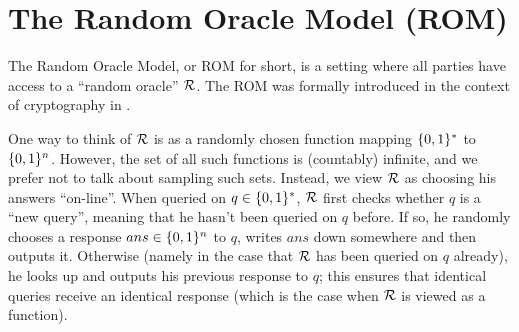 \section{The Random Oracle Model (ROM)}
\label{SEC:ROM}
The Random Oracle Model, or ROM for short, is a setting where all parties have
access to a ``random oracle'' $\mathcal{R}$. The ROM was formally introduced
in the context of cryptography in \cite{bellare:rompractical}. 

One way to think of $\mathcal{R}$ is as a randomly chosen function mapping
$\{0,1\}^{*}$ to $\{0,1\}^{n}$.
However, the set of all such functions is (countably)
infinite, and we prefer not to talk about sampling such sets.
Instead, we view $\mathcal{R}$ as choosing his answers ``on-line''.  When
queried on $q \in \{0,1\}^{*}$, $\mathcal{R}$ first checks whether $q$ is a ``new
query'', meaning that he hasn't been queried on $q$ before. If so, he randomly
chooses a response $ans \in \{0,1\}^{n}$ to $q$, writes $ans$ down somewhere
and then outputs it.  Otherwise (namely in the case that $\mathcal{R}$ has been
queried on $q$ already), he looks up and outputs his previous response to $q$;
this ensures that identical queries receive an identical response (which is
the case when $\mathcal{R}$ is viewed as a function).  

